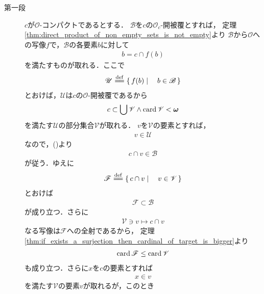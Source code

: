 	\begin{sketch}\mbox{}
		\begin{description}
			\item[第一段]
				$c$が$\mathscr{O}$-コンパクトであるとする．
				$\mathscr{B}$を$c$の$\mathscr{O}_{c}$-開被覆とすれば，
				定理\ref{thm:direct_product_of_non_empty_sets_is_not_empty}より
				$\mathscr{B}$から$\mathscr{O}$への写像$f$で，$\mathscr{B}$の各要素$b$に対して
				\begin{align}
					b = c \cap f(b)
					\label{fom:thm_compactness_in_subspace}
				\end{align}
				を満たすものが取れる．ここで
				\begin{align}
					\mathscr{U} \defeq \Set{f(b)}{b \in \mathscr{B}}
				\end{align}
				とおけば，$\mathscr{U}$は$c$の$\mathscr{O}$-開被覆であるから
				\begin{align}
					c \subset \bigcup \mathscr{V} \wedge \operatorname{card} \mathscr{V} < {\boldsymbol \omega}
				\end{align}
				を満たす$\mathscr{U}$の部分集合$\mathscr{V}$が取れる．
				$v$を$\mathscr{V}$の要素とすれば，
				\begin{align}
					v \in \mathscr{U}
				\end{align}
				なので，()より
				\begin{align}
					c \cap v \in \mathscr{B}
				\end{align}
				が従う．ゆえに
				\begin{align}
					\mathscr{F} \defeq \Set{c \cap v}{v \in \mathscr{V}}
				\end{align}
				とおけば
				\begin{align}
					\mathscr{F} \subset \mathscr{B}
					\label{fom:thm_compactness_in_subspace_2}
				\end{align}
				が成り立つ．さらに
				\begin{align}
					\mathscr{V} \ni v \longmapsto c \cap v
				\end{align}
				なる写像は$\mathscr{F}$への全射であるから，
				定理\ref{thm:if_exists_a_surjection_then_cardinal_of_target_is_bigger}より
				\begin{align}
					\operatorname{card} \mathscr{F} \leq \operatorname{card} \mathscr{V}
					\label{fom:thm_compactness_in_subspace_3}
				\end{align}
				も成り立つ．さらに$x$を$c$の要素とすれば
				\begin{align}
					x \in v
				\end{align}
				を満たす$\mathscr{V}$の要素$v$が取れるが，このとき

\end{description}
\end{sketch}
